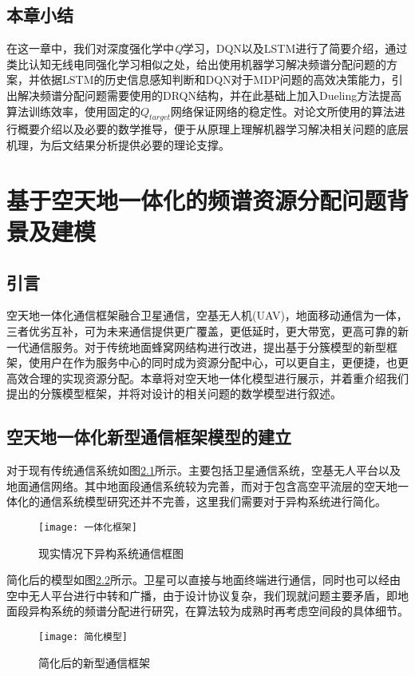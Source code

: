 \section{本章小结}
在这一章中，我们对深度强化学中\textit{Q}学习，DQN以及LSTM进行了简要介绍，通过类比认知无线电同强化学习相似之处，给出使用机器学习解决频谱分配问题的方案，并依据LSTM的历史信息感知判断和DQN对于MDP问题的高效决策能力，引出解决频谱分配问题需要使用的DRQN结构，并在此基础上加入Dueling方法提高算法训练效率，使用固定的$Q_{target}$网络保证网络的稳定性。对论文所使用的算法进行概要介绍以及必要的数学推导，便于从原理上理解机器学习解决相关问题的底层机理，为后文结果分析提供必要的理论支撑。

\chapter{基于空天地一体化的频谱资源分配问题背景及建模}
\section{引言}
空天地一体化通信框架融合卫星通信，空基无人机(UAV)，地面移动通信为一体，三者优劣互补，可为未来通信提供更广覆盖，更低延时，更大带宽，更高可靠的新一代通信服务。对于传统地面蜂窝网结构进行改进，提出基于分簇模型的新型框架，使用户在作为服务中心的同时成为资源分配中心，可以更自主，更便捷，也更高效合理的实现资源分配。本章将对空天地一体化模型进行展示，并着重介绍我们提出的分簇模型框架，并将对设计的相关问题的数学模型进行叙述。

\section{空天地一体化新型通信框架模型的建立}
对于现有传统通信系统如图\ref{fig:现有框架}所示。主要包括卫星通信系统，空基无人平台以及地面通信网络。其中地面段通信系统较为完善，而对于包含高空平流层的空天地一体化的通信系统模型研究还并不完善，这里我们需要对于异构系统进行简化。
\begin{figure}[h]
	\centering
	\texttt{[image: 一体化框架]}
	\caption{现实情况下异构系统通信框图}
	\label{fig:现有框架}
\end{figure}

简化后的模型如图\ref{fig:简化模型}所示。卫星可以直接与地面终端进行通信，同时也可以经由空中无人平台进行中转和广播，由于设计协议复杂，我们现就问题主要矛盾，即地面段异构系统的频谱分配进行研究，在算法较为成熟时再考虑空间段的具体细节。

\begin{figure}[h]
	\centering
	\texttt{[image: 简化模型]}
	\caption{简化后的新型通信框架}
	\label{fig:简化模型}
\end{figure}

